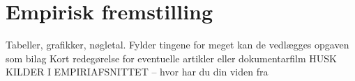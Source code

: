 \section{Empirisk fremstilling}
Tabeller, grafikker, nøgletal. Fylder tingene for meget kan de vedlægges opgaven
som bilag Kort redegørelse for eventuelle artikler eller dokumentarfilm HUSK
KILDER I EMPIRIAFSNITTET – hvor har du din viden fra
